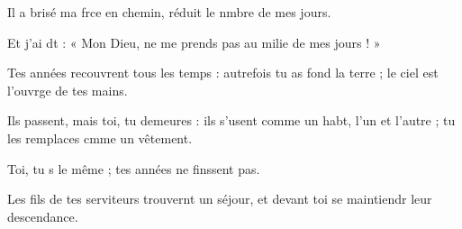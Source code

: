 \item Il a brisé ma frce en chemin,\psstar{} réduit le nmbre de mes jours.
\item Et j’ai dt : « Mon Dieu,\psstar{} ne me prends pas au milie de mes jours ! »
\item Tes années recouvrent tous les temps :\pscross{} autrefois tu as fond la terre ;\psstar{} le ciel est l’ouvrge de tes mains.
\item Ils passent, mais toi, tu demeures :\pscross{} ils s’usent comme un habt, l’un et l’autre ;\psstar{} tu les remplaces cmme un vêtement.
\item Toi, tu s le même ;\psstar{} tes années ne finssent pas.
\item Les fils de tes serviteurs trouvernt un séjour,\psstar{} et devant toi se maintiendr leur descendance.